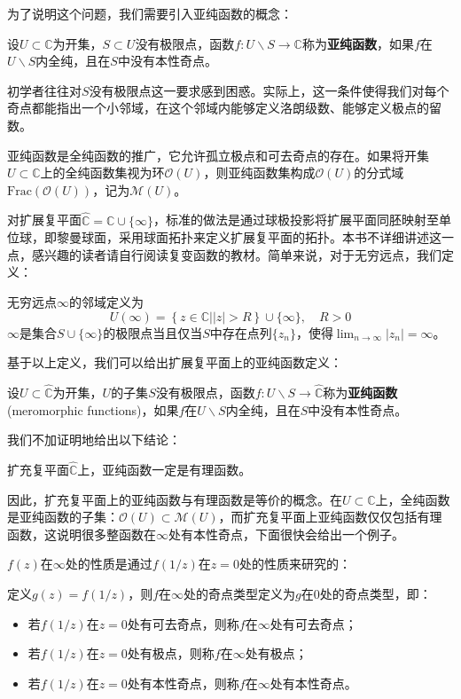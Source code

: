 为了说明这个问题，我们需要引入亚纯函数的概念\cite{Function_Theory}：
\begin{definition}[亚纯函数]
    设$U\subset\mathbb{C}$为开集，$S\subset U$没有极限点，函数$f:U\backslash S\to\mathbb{C}$称为\textbf{亚纯函数}，如果$f$在$U\backslash S$内全纯，且在$S$中没有本性奇点。
\end{definition}

初学者往往对$S$没有极限点这一要求感到困惑。实际上，这一条件使得我们对每个奇点都能指出一个小邻域，在这个邻域内能够定义洛朗级数、能够定义极点的留数。

亚纯函数是全纯函数的推广，它允许孤立极点和可去奇点的存在。如果将开集$U\subset \mathbb{C}$上的全纯函数集视为环$\mathcal{O} (U)$，则亚纯函数集构成$\mathcal{O} (U)$的分式域$\mathrm{Frac}(\mathcal{O} (U))$，记为$\mathcal{M} (U)$。

对扩展复平面$\hat{\mathbb{C}}=\mathbb{C}\cup\{\infty\}$，标准的做法是通过球极投影将扩展平面同胚映射至单位球，即黎曼球面，采用球面拓扑来定义扩展复平面的拓扑。本书不详细讲述这一点，感兴趣的读者请自行阅读复变函数的教材。简单来说，对于无穷远点，我们定义：
\begin{definition}[无穷远点的邻域]
    无穷远点$\infty$的邻域定义为
    \[U(\infty)=\left\{\left.z\in\mathbb{C} \right||z|>R\right\}\cup\{\infty\},\quad R>0\]
    $\infty$是集合$S\cup\{\infty\}$的极限点当且仅当$S$中存在点列$\{z_n\}$，使得$\lim_{n\to\infty}|z_n|=\infty$。
\end{definition}
基于以上定义，我们可以给出扩展复平面上的亚纯函数定义：
\begin{definition}[扩展复平面上的亚纯函数]
    设$U\subset\hat{\mathbb{C}}$为开集，$U$的子集$S$没有极限点，函数$f:U\backslash S\to\hat{\mathbb{C}}$称为\textbf{亚纯函数}(meromorphic functions)，如果$f$在$U\backslash S$内全纯，且在$S$中没有本性奇点。
\end{definition}

我们不加证明地给出以下结论\cite{Function_Theory}：
\begin{claim}
    扩充复平面$\hat{\mathbb{C}}$上，亚纯函数一定是有理函数。
\end{claim}
因此，扩充复平面上的亚纯函数与有理函数是等价的概念。在$U\subset\mathbb{C}$上，全纯函数是亚纯函数的子集：$\mathcal{O}(U)\subset\mathcal{M}(U)$，而扩充复平面上亚纯函数仅仅包括有理函数，这说明很多整函数在$\infty$处有本性奇点，下面很快会给出一个例子。

$f(z)$在$\infty$处的性质是通过$f(1/z)$在$z=0$处的性质来研究的：
\begin{definition}[无穷远点的奇点类型]
    定义$g(z)=f(1/z)$，则$f$在$\infty$处的奇点类型定义为$g$在$0$处的奇点类型，即：
    \begin{itemize}
        \item 若$f(1/z)$在$z=0$处有可去奇点，则称$f$在$\infty$处有可去奇点；
        \item 若$f(1/z)$在$z=0$处有极点，则称$f$在$\infty$处有极点；
        \item 若$f(1/z)$在$z=0$处有本性奇点，则称$f$在$\infty$处有本性奇点。
    \end{itemize}
\end{definition}

